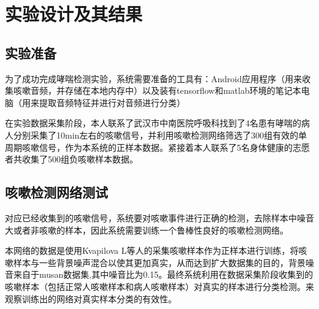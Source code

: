 \chapter{实验设计及其结果}
\section{实验准备}
为了成功完成哮喘检测实验，系统需要准备的工具有：Android应用程序（用来收集咳嗽音频，并存储在本地内存中）以及装有tensorflow和matlab环境的笔记本电脑（用来提取音频特征并进行对音频进行分类）

在实验数据采集阶段，本人联系了武汉市中南医院呼吸科找到了4名患有哮喘的病人分别采集了10min左右的咳嗽信号，并利用咳嗽检测网络筛选了300组有效的单周期咳嗽信号，作为本系统的正样本数据。紧接着本人联系了5名身体健康的志愿者共收集了500组负咳嗽样本数据。
\section{咳嗽检测网络测试}
对应已经收集到的咳嗽信号，系统要对咳嗽事件进行正确的检测，去除样本中噪音大或者非咳嗽的样本，因此系统需要训练一个鲁棒性良好的咳嗽检测网络。

本网络的数据是使用Kvapilova L等人\cite{kvapilova2019continuous}的采集咳嗽样本作为正样本进行训练，将咳嗽样本与一些背景噪声混合以使其更加真实，从而达到扩大数据集的目的，背景噪音来自于musan数据集\cite{musan2015},其中噪音比为0.15。最终系统利用在数据采集阶段收集到的咳嗽样本（包括正常人咳嗽样本和病人咳嗽样本）对真实的样本进行分类检测。来观察训练出的网络对真实样本分类的有效性。
